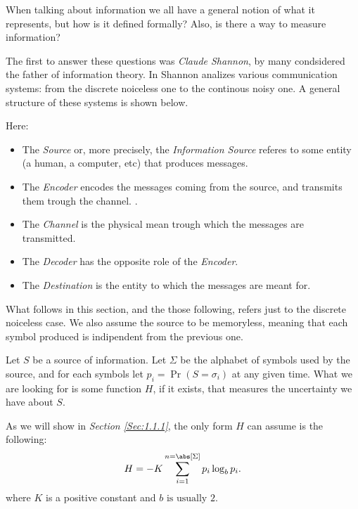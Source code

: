 \documentclass{subfiles}
\begin{document}
    When talking about information we all have a general notion of what it represents,
        but how is it defined formally? 
        Also, is there a way to measure information?

    The first to answer these questions was \emph{Claude Shannon}, 
        by many condsidered the father of information theory.
    In \cite{shannon1948} Shannon analizes various communication systems:
        from the discrete noiceless one to the continous noisy one.
        A general structure of these systems is shown below.
        

    Here:
    \begin{itemize}
        \item The \emph{Source} or, more precisely, 
            the \emph{Information Source} referes to some entity
            (a human, a computer, etc) that produces messages.

        \item The \emph{Encoder} encodes the messages coming from the source,
            and transmits them trough the channel.
.
        \item The \emph{Channel} is the physical mean trough which the messages
            are transmitted.

        \item The \emph{Decoder} has the opposite role of the \emph{Encoder}.
        \item The \emph{Destination} is the entity to which the messages are meant for.
    \end{itemize}

    \begin{remark*}
        What follows in this section, and the those following,
        refers just to the discrete noiceless case. 
        We also assume the source to be memoryless, 
        meaning that each symbol produced is indipendent from the previous one.
    \end{remark*}

    Let \(S\) be a source of information. 
    Let \(\Sigma\) be the alphabet of symbols used by the source,
    and for each symbols let \(p_{i} = \Pr(S = \sigma_{i})\) at any given time.
    What we are looking for is some function \(H\), if it exists,
    that measures the uncertainty we have about \(S\).

    As we will show in \emph{Section \ref{Sec:1.1.1}}, 
        the only form \(H\) can assume is the following:
    \begin{equation}\label{Eq:1}
        H = -K \sum_{i = 1}^{n = \abs[\Sigma]}{p_{i} \log_{b} p_{i}}.
    \end{equation}
    where \(K\) is a positive constant and \(b \text{ is usually } 2\).
\end{document}
